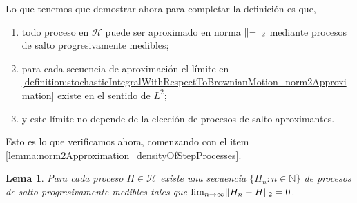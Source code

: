 \documentclass{article}
\newcommand{\placeholderParameter}{-}
\newcommand{\naturalNumbers}{\mathbb{N}}
\DeclarePairedDelimiter{\norm}{\|}{\|}
\theoremstyle{plain}
\newtheorem{lemma}{Lema}
\theoremstyle{remark}
\theoremstyle{definition}
\begin{document}
Lo que tenemos que demostrar ahora para completar la definición es que,
\begin{enumerate}
  \item
  \label{lemma:norm2Approximation_densityOfStepProcesses}
  todo proceso en \(\mathcal{H}\) puede ser aproximado en norma 
  \(\norm{\placeholderParameter}_2\) 
  mediante procesos de salto progresivamente medibles;
  \item
  \label{lemma:norm2Approximation_sequenceConvergence}
  para cada secuencia de aproximación el límite en \eqref{definition:stochasticIntegralWithRespectToBrownianMotion_norm2Approximation} existe en el sentido de \(L^2\);
  \item
  \label{lemma:norm2Approximation_limitUniqueness}
  y este límite no depende de la elección de procesos de salto aproximantes.
\end{enumerate} 
Esto es lo que verificamos ahora, comenzando con el item \ref{lemma:norm2Approximation_densityOfStepProcesses}.
\begin{lemma}
  Para cada proceso \(H \in \mathcal{H}\) existe una secuencia \(\{H_n : n \in \naturalNumbers\}\) de procesos de salto progresivamente medibles tales que \(\lim_{n \rightarrow \infty} \norm{H_n - H}_2 = 0\).
\end{lemma}
\end{document}
